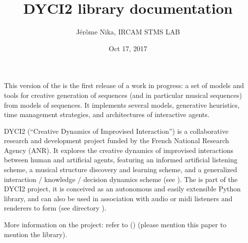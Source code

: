 \documentclass[letterpaper,10pt,english]{sphinxmanual}
\title{DYCI2 library documentation}
\date{Oct 17, 2017}
\author{Jérôme Nika, IRCAM STMS LAB}
\begin{document}
\maketitle
\sphinxtableofcontents
{}\label{\detokenize{index::doc}}



\chapter{}
\label{\detokenize{index:introduction}}\label{\detokenize{index:dyci2-s-documentation}}
This version of the  is the first release of a work in progress: a set of models and tools for creative generation of sequences (and in particular musical sequences) from models of sequences. It implements several models, generative heuristics, time management strategies, and architectures of interactive agents.

DYCI2 (“Creative Dynamics of Improvised Interaction”) is a collaborative research and development project funded by the French National Research Agency (ANR). It explores the creative dynamics of improvised interactions between human and artificial agents, featuring an informed artificial listening scheme, a musical structure discovery and learning scheme, and a generalized interaction / knowledge / decision dynamics scheme (see ). The  is part of the DYCI2 project, it is conceived as an autonomous and easily extensible Python library, and can also be used in association with audio or midi listeners and renderers to form  (see directory ).

More information on the project: refer to  () (please mention this paper to mention the library).
\end{document}
